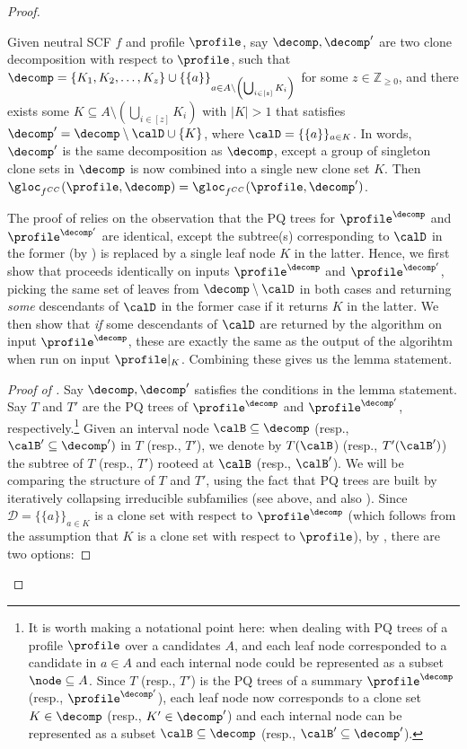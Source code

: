 \begin{proof}
    \begin{lemma}\label{lemma:fcc_intermediary}
        Given neutral SCF $f$ and profile $\profile$, say $\decomp, \decomp'$ are two clone decomposition with respect to $\profile$, such that $\decomp= \{K_1,K_2,\ldots, K_z\} \cup \{\{a\}\}_{a \in A \setminus \left( \bigcup_{i \in [z]}K_i \right)}$ for some $z \in \mathbb{Z}_{\geq 0}$, and there exists some $K \subseteq A \setminus \left( \bigcup_{i \in [z]}K_i \right)$ with $|K|>1$ that satisfies $\decomp' = \decomp \setminus \calD \cup \{K\}$, where $\calD=\{\{a\}\}_{a \in K}$. In words, $\decomp'$ is the same decomposition as $\decomp$, except a group of singleton clone sets in $\decomp$ is now combined into a single new clone set $K$. Then $\gloc_{f^{CC}}(\profile, \decomp)=\gloc_{f^{CC}}(\profile, \decomp')$.
    \end{lemma}
    The proof of  relies on the observation that the PQ trees for $\profile^\decomp$ and  $\profile^{\decomp'}$ are identical, except the subtree(s) corresponding to $\calD$ in the former (by ) is replaced by a single leaf node $K$ in the latter. Hence, we first show that  proceeds identically on inputs $\profile^\decomp$ and  $\profile^{\decomp'}$, picking the same set of leaves from $\decomp \setminus \calD$ in both cases and returning \emph{some} descendants of $\calD$ in the former case if it returns $K$ in the latter. We then show that \emph{if} some descendants of $\calD$ are returned by the algorithm on input $\profile^\decomp$, these are exactly the same as the output of the algorihtm when run on input $\profile|_K$. Combining these gives us the lemma statement.
    \begin{proof}[Proof of ]
        Say $\decomp, \decomp'$ satisfies the conditions in the lemma statement. Say $T$ and $T'$ are the PQ trees of $\profile^\decomp$ and $\profile^{\decomp'}$, respectively.\footnote{It is worth making a notational point here: when dealing with PQ trees of a profile $\profile$ over a candidates $A$, and each leaf node corresponded to a candidate in $a \in A$ and each internal node could be represented as a subset $\node \subseteq A$. Since $T$ (resp., $T'$) is the PQ trees of a summary $\profile^\decomp$ (resp., $\profile^{\decomp'}$), each leaf node now corresponds to a clone set $K \in \decomp$ (resp., $K' \in \decomp'$) and each internal node can be represented as a subset $\calB \subseteq \decomp$ (resp., $\calB' \subseteq \decomp'$).} Given an interval node $\calB \subseteq \decomp$ (resp., $\calB' \subseteq \decomp')$ in $T$ (resp., $T'$), we denote by $T(\calB$) (resp., $T'(\calB')$) the subtree of $T$ (resp., $T'$) rooteed at $\calB$ (resp., $\calB'$). We will be comparing the structure of $T$ and $T'$, using the fact that PQ trees are built by iteratively collapsing irreducible subfamilies (see  above, and also \citet{Elkind10:Clone}). Since $\mathcal{D}=\{\{a\}\}_{a \in K}$ is a clone set with respect to $\profile^\decomp$ (which follows from the assumption that $K$ is a clone set with respect to $\profile$), by , there are two options:

\end{proof}
\end{proof}

